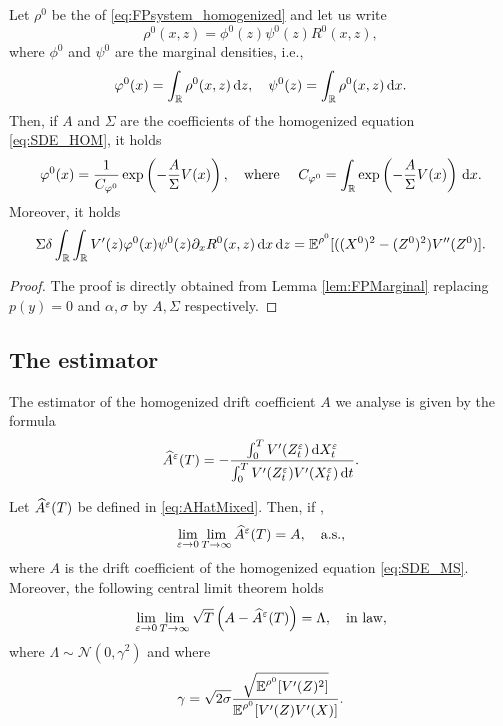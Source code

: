 \documentclass[10pt]{article}
\begin{document}
\begin{corollary}\label{lem:FPMarginal_Hom} Let $\rho^0$ be the  of \eqref{eq:FPsystem_homogenized} and let us write 
	\begin{equation}
		\rho^0(x, z) = \phi^0(z)\psi^0(z)R^0(x,z),
	\end{equation}
	where $\phi^0$ and $\psi^0$ are the marginal densities, i.e., 
	\begin{equation}
		\varphi^0(x) = \int_{\mathbb{R}} \rho^0(x,z) \,\mathrm{d} z, \quad \psi^0(z) = \int_{\mathbb{R}} \rho^0(x,z) \,\mathrm{d} x.
	\end{equation}
	Then, if $A$ and $\Sigma$ are the coefficients of the homogenized equation \eqref{eq:SDE_HOM}, it holds
	\begin{equation}
		\varphi^0(x) = \frac{1}{C_{\varphi^0}} \exp\left(- \frac{A}{\Sigma} V(x)\right), \quad \text{where } \quad C_{\varphi^0} = \int_{\mathbb{R}} \exp\left(- \frac{A}{\Sigma} V(x) \right) \,\mathrm{d} x.
	\end{equation}
	Moreover, it holds
	\begin{equation}
		\Sigma \delta \int_{\mathbb{R}} \int_{\mathbb{R}} V'(z) \varphi^0(x) \psi^0(z) \partial_x R^0(x,z) \,\mathrm{d} x \,\mathrm{d} z = \operatorname{\mathbb{E}}^{\rho^0}[((X^0)^2 - (Z^0)^2)V''(Z^0)].
	\end{equation}
\end{corollary}
\begin{proof} The proof is directly obtained from Lemma \ref{lem:FPMarginal} replacing $p(y)=0$ and $\alpha, \sigma$ by $A, \Sigma$ respectively. 
\end{proof}

\subsection{The estimator}

The estimator of the homogenized drift coefficient $A$ we analyse is given by the formula
\begin{equation}\label{eq:AHatMixed}
\widehat A^\varepsilon(T) = - \frac{\int_0^T V'(Z^\varepsilon_t) \,\mathrm{d} X^\varepsilon_t}{\int_0^T V'(Z^\varepsilon_t) V'(X^\varepsilon_t) \,\mathrm{d} t}.
\end{equation}

\begin{theorem}\label{thm:mainTheorem} Let $\widehat A^\varepsilon(T)$ be defined in \eqref{eq:AHatMixed}. Then, if , 
	\begin{equation}\label{eq:theoremFirst}
	\lim_{\varepsilon \to 0} \lim_{T \to \infty} \widehat A^\varepsilon(T) = A, \quad \text{a.s.},
	\end{equation}
	where $A$ is the drift coefficient of the homogenized equation \eqref{eq:SDE_MS}. Moreover, the following central limit theorem holds
	\begin{equation}\label{eq:theoremSecond}
	\lim_{\varepsilon \to 0} \lim_{T \to \infty} \sqrt{T} \left(A - \widehat A^\varepsilon(T) \right) = \Lambda, \quad \text{in law}, 
	\end{equation}
	where $\Lambda \sim \mathcal N(0, \gamma^2)$ and where 
	\begin{equation}
	\gamma = \sqrt{2\sigma} \frac{\sqrt{\operatorname{\mathbb{E}}^{\rho^0}[V'(Z)^2]}}{\operatorname{\mathbb{E}}^{\rho^0}[V'(Z)V'(X)]}.
	\end{equation}
\end{theorem}
\end{document}
